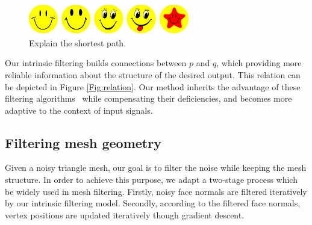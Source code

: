 \begin{figure}
\centering
\includegraphics[width = 7.0cm]{results/smileface.jpg}
\vspace{0.5mm}
\caption{ Explain the shortest path.}
\label{Fig:shortestpath}
\end{figure}

Our intrinsic filtering builds connections between $p$ and $q$, which providing more reliable information about the structure of the desired output.
This relation can be depicted in Figure \ref{Fig:relation}.
Our method inherits the advantage of these filtering algorithms~\cite{tomasi1998bilateral, grazzini2009edge, Chang2015propagated} while compensating their deficiencies,
and becomes more adaptive to the context of input signals.


\subsection{Filtering mesh geometry}

Given a noisy triangle mesh, our goal is to filter the noise while keeping the mesh structure.
In order to achieve this purpose, we adapt a two-stage process which be widely used in mesh filtering.
Firstly, noisy face normals are filtered iteratively by our intrinsic filtering model. %
Secondly, according to the filtered face normals, vertex positions are updated iteratively though gradient descent.

